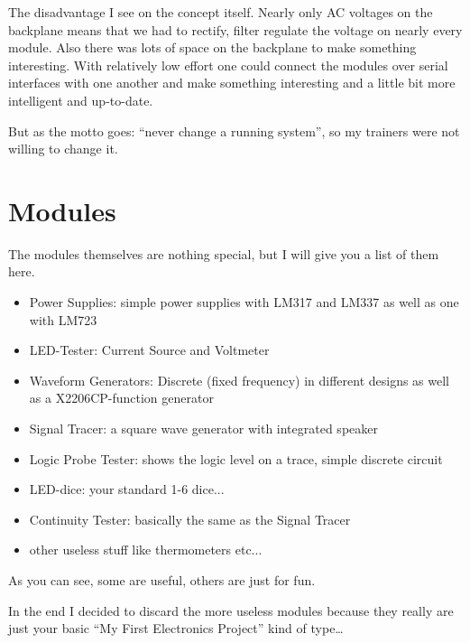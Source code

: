 The disadvantage I see on the concept itself. Nearly only AC voltages on the backplane means that we had to rectify, filter regulate the voltage on nearly every module. Also there was lots of space on the backplane to make something interesting. With relatively low effort one could connect the modules over serial interfaces with one another and make something interesting and a little bit more intelligent and up-to-date. 

But as the motto goes: ``never change a running system'', so my trainers were not willing to change it.

\section{Modules}
The modules themselves are nothing special, but I will give you a list of them here. 

\begin{itemize}
\item Power Supplies: simple power supplies with LM317 and LM337 as well as one with LM723
\item LED-Tester: Current Source and Voltmeter
\item Waveform Generators: Discrete (fixed frequency) in different designs as well as a X2206CP-function generator
\item Signal Tracer: a square wave generator with integrated speaker
\item Logic Probe Tester: shows the logic level on a trace, simple discrete circuit
\item LED-dice: your standard 1-6 dice...
\item Continuity Tester: basically the same as the Signal Tracer
\item other useless stuff like thermometers etc...
\end{itemize}

As you can see, some are useful, others are just for fun. 

In the end I decided to discard the more useless modules because they really are just your basic ``My First Electronics Project'' kind of type\dots